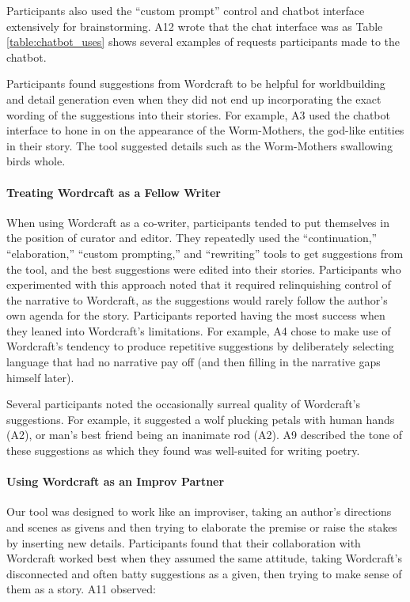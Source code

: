 Participants also used the ``custom prompt'' control and chatbot interface extensively for brainstorming.
A12 wrote that the chat interface was as 
Table \ref{table:chatbot_uses} shows several examples of requests participants made to the chatbot.

Participants found suggestions from Wordcraft to be helpful for worldbuilding and detail generation even when they did not end up incorporating the exact wording of the suggestions into their stories.
For example, A3 used the chatbot interface to hone in on the appearance of the Worm-Mothers, the god-like entities in their story.
The tool suggested details such as the Worm-Mothers swallowing birds whole.


\paragraph{Treating Wordrcaft as a Fellow Writer}
When using Wordcraft as a co-writer, participants tended to put themselves in the position of curator and editor. 
They repeatedly used the ``continuation,'' ``elaboration,'' ``custom prompting,'' and ``rewriting'' tools to get suggestions from the tool, and the best suggestions were edited into their stories. 
Participants who experimented with this approach noted that it required relinquishing control of the narrative to Wordcraft, as the suggestions would rarely follow the author's own agenda for the story.
Participants reported having the most success when they leaned into Wordcraft's limitations.
For example, A4 chose to make use of Wordcraft's tendency to produce repetitive suggestions by deliberately selecting language that had no narrative pay off (and then filling in the narrative gaps himself later).

Several participants noted the occasionally surreal quality of Wordcraft's suggestions. For example, it suggested a wolf plucking petals with human hands (A2), or man’s best friend being an inanimate rod (A2). A9 described the tone of these suggestions as  
which they found was well-suited for writing poetry. %

\paragraph{Using Wordcraft as an Improv Partner}
\label{section:improv}
Our tool was designed to work like an improviser, taking an author's directions and scenes as givens and then trying to elaborate the premise or raise the stakes by inserting new details.
Participants found that their collaboration with Wordcraft worked best when they assumed the same attitude, taking Wordcraft’s disconnected and often batty suggestions as a given, then trying to make sense of them as a story.
A11 observed: 

